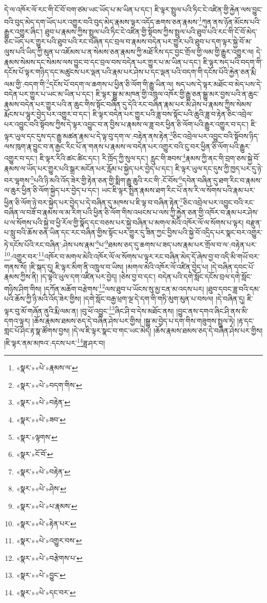 དེ་ལ་འཁོར་ལོ་རང་གི་ངོ་བོ་བག་ཙམ་ཡང་ཡོད་པ་མ་ཡིན་པ་དང་། ཇི་ལྟར་སྤྲུལ་པའི་ཏིང་ངེ་འཛིན་གྱི་རྐྱེན་ལས་བྱུང་བའི་བུད་མེད་དག་ཡོད་པར་འགྱུར་བའི་བུད་མེད་རྣམས་ལྟར་འདོད་ཆགས་ཅན་རྣམས་\footnote{«སྣར་»«པེ་»རྣམས་ལ་}ཀུན་ནས་ཉོན་མོངས་པའི་རྒྱུར་འགྱུར་ཞིང་། ཐུབ་པ་རྣམས་ཀྱིས་སྤྲུལ་པའི་ཏིང་ངེ་འཛིན་གྱི་སྟོབས་ཀྱིས་སྤྲུལ་པའི་ཐུབ་པའི་རང་གི་ངོ་བོ་མེད་ཅིང་ཡོད་པར་གྱུར་པའི་ཐུབ་པའི་རང་བཞིན་དང་བྲལ་བ་རྣམས་བདེན་པར་གྱུར་པའི་ཐུབ་པ་དག་ལྟར་སྐྱེ་བོ་མ་ལུས་པའི་ཡིད་ཀྱི་མུན་པ་འཇོམས་པ་ན་སེམས་ཅན་རྣམས་ཀྱི་མཐོ་རིས་དང་བྱང་གྲོལ་གྱི་ལམ་གྱི་རྒྱུར་འགྱུར་ལ། དེ་རྣམས་སེམས་དང་སེམས་ལས་བྱུང་བ་དང་བྲལ་བས་བདེན་པར་གྱུར་པ་མ་ཡིན་པ་དང་། ཇི་ལྟར་སད་པའི་བདག་གི་དངོས་པོ་ལྟར་གཉིད་དང་མཚུངས་པར་ལྡན་པའི་རྣམ་པར་ཤེས་པ་དང་ལྡན་པའི་བདག་གི་དངོས་པོའི་རྐྱེན་ཅན་རྨི་ལམ་གྱི་:བདག་གི་\footnote{«སྣར་»«པེ་»བདག་གིས་}དངོས་པོ་བདག་ལ་ཆགས་པ་ཕྱིན་ཅི་ལོག་གི་རྒྱུ་ཡིན་ལ། སད་པས་དེ་ལྟར་མཐོང་བ་མེད་པས་དེ་བདེན་པར་གྱུར་པ་ཡང་མ་ཡིན་པ་དང་། ཇི་ལྟར་སྒྱུ་མ་མཁན་གྱི་འཁྲུལ་འཁོར་གྱི་རྒྱུ་ཅན་སྒྱུ་མར་བྱས་པའི་ན་ཆུང་རྣམས་བདེན་པར་གྱུར་པའི་ན་ཆུང་གིས་སྟོང་བཞིན་དུ་དེའི་རང་བཞིན་རྣམ་པར་མི་ཤེས་པ་རྣམས་ཀྱིས་སེམས་རྨོངས་པ་ལྷུར་བྱེད་པར་འགྱུར་བ་དང་། ཇི་ལྟར་བདེན་པར་གྱུར་པའི་ཟླ་བས་སྟོང་པའི་ཆུའི་ཟླ་བ་རྟེན་ཅིང་འབྲེལ་པར་འབྱུང་བའི་སྟོབས་ཀྱིས་དེ་ལྟར་འབྱུང་བ་ན་བྱིས་པ་རྣམས་ལ་ཟླ་བར་ཕྱིན་ཅི་ལོག་པའི་རྒྱུར་འགྱུར་བ་དང་། ཇི་ལྟར་ཡུལ་དང་དུས་དང་རྒྱུ་མཚན་རྣམ་པ་དེ་ལྟ་བུ་དག་ལ་:བརྟེན་ནས་རྟེན་\footnote{«སྣར་»«པེ་»བརྟེན་}ཅིང་འབྲེལ་པར་འབྱུང་བའི་སྟོབས་ཉིད་ལས་ཁུག་རྣ་བྱུང་བ་ན་རྒྱང་རིང་པོ་ན་གནས་པ་རྣམས་ལ་བདེན་པར་འགྱུར་བའི་ངུ་བར་ཕྱིན་ཅི་ལོག་པའི་རྒྱུར་འགྱུར་བ་དང་། ཇི་ལྟར་རིའི་ཚང་ཚིང་དང་། རི་ཁྲོད་ཀྱི་སུལ་དང་། རླུང་གི་ཟབས་\footnote{«སྣར་»«པེ་»ཟབ་}རྣམས་ཀྱི་ནང་གི་བྲག་ཅས་སྐྱེ་བོ་རྣམས་ལ་ཡོད་པར་གྱུར་པའི་སྒྲར་མངོན་པར་རློམ་པ་སྐྱེད་པར་བྱེད་པ་དང་། ཇི་ལྟར་ཡུལ་དང་དུས་ཀྱི་ཁྱད་པར་དུ་ཉེ་བར་ལྷགས་\footnote{«སྣར་»ལྟགས་}པའི་ཉི་མའི་འོད་ཟེར་གྱི་རྟེན་ཅན་གྱི་སྨིག་རྒྱུ་ཆུའི་རང་གི་:ངོ་བོས་\footnote{«སྣར་»ངོ་བོ་}དབེན་བཞིན་དུ་ཐག་རིང་བ་རྣམས་ལ་ཆུར་ཕྱིན་ཅི་ལོག་སྐྱེད་པར་བྱེད་པ་དང་། ཡང་ཇི་ལྟར་སྤྲིན་རྣམས་ཐག་རིང་པོ་ནས་རི་ལ་སོགས་པའི་རྣམ་པར་ཕྱིན་ཅི་ལོག་ཉེ་བར་སྐྱེད་པར་བྱེད་པ་དེ་བཞིན་དུ་མཁས་པ་ཇི་ལྟ་བ་བཞིན་རྟེན་\footnote{«སྣར་»«པེ་»བརྟེན་}ཅིང་འབྲེལ་པར་འབྱུང་བའི་རང་བཞིན་ལ་བཟོ་བ་རྣམས་ལ་མ་རིག་པའི་ཕྱིན་ཅི་ལོག་གིས་འཕངས་པ་ལས་ཀྱི་རྐྱེན་ཅན་གྱི་འཁོར་བ་རྣམ་པར་ཤེས་པ་ལ་སོགས་པའི་སྐྱེ་བ་ཕྱི་རོལ་གྱི་སྣོད་དང་བཅས་པར་སྐྱེ་བཞིན་པ་མགལ་མེའི་འཁོར་ལོ་ལ་སོགས་པ་ལྟར། བརྫུན་པ་སླུ་བའི་ཆོས་ཅན་ཡིན་དང་རང་བཞིན་གྱིས་སྟོང་པར་གྱུར་དུ་ཟིན་ཀྱང་བྱིས་པའི་སྐྱེ་བོ་འདྲིད་པར་སྣང་བར་འགྱུར་ཏེ་དངོས་པོའི་རང་བཞིན་:ཤེས་པས་རྣམ་\footnote{«སྣར་»«པེ་»ཤེས་}པ་\footnote{«སྣར་»«པེ་»པ་རྣམས་}ཐམས་ཅད་དུ་ཆགས་པ་ཟད་པས་རྣམ་པར་གྲོལ་བ་ལ་:བརྟེན་པར་\footnote{«སྣར་»«པེ་»རྟེན་པར་}:འགྱུར་བར་\footnote{«སྣར་»«པེ་»འགྱུར་བས་}འཁོར་བ་མགལ་མེའི་འཁོར་ལོ་ལ་སོགས་པ་ལྟར་རང་བཞིན་མེད་དོ་ཞེས་བྱ་བ་འདི་མི་གཡོ་བར་གནས་སོ། །ཇི་སྐད་དུ། ཇི་ལྟར་མིག་ནི་འཁྲུལ་བ་ཡིས། །མགལ་མེའི་འཁོར་ལོ་འཛིན་བྱེད་པ། །དེ་བཞིན་དབང་པོ་རྣམས་ཀྱིས་ནི། །ད་ལྟའི་ཡུལ་དག་འཛིན་པར་བྱེད། །ཅེས་བྱ་བ་དང་། བདེན་པའི་དགེ་སློང་དངོས་བྲལ་དགེ་སློང་གཉིས་ཤིག་གིས། །དཀོན་མཆོག་བརྩེགས་\footnote{«སྣར་»«པེ་»བརྩེགས་པ་}ལས་ཐུབ་པ་ཡོངས་སུ་མྱ་ངན་མ་འདས་པར། །ཐུབ་དབང་ཟླ་བའི་དམ་པའི་ཆོས་ཀྱི་ཉི་མའི་འོད་ཟེར་གྱིས། །དགེ་སློང་བརྒྱ་ཕྲག་ལྔ་དེ་དག་གི་གཏི་མུག་མུན་པ་བསལ། །དེ་བཞིན་དུ། ཇི་ལྟར་བུ་མོ་གཞོན་ནུའི་རྨི་ལམ་ན། །བུ་ཕོ་འབྱུང་\footnote{«སྣར་»«པེ་»བྱུང་}ཞིང་ཤི་བ་དེས་མཐོང་ནས། །བྱུང་ནས་དགའ་ཞིང་ཤི་ནས་མི་དགའ་ལྟར། །ཆོས་རྣམས་ཐམས་ཅད་དེ་བཞིན་ཤེས་པར་གྱིས། །སྒྱུ་མ་བྱེད་པ་དག་གིས་གཟུགས་སྤྲུལ་ཏེ། །རྟ་དང་གླང་པོ་ཤིང་རྟ་སྣ་ཚོགས་བྱས། །དེ་ལ་ཇི་ལྟར་སྣང་བ་གང་ཡང་མེད། །ཆོས་རྣམས་ཐམས་ཅད་དེ་བཞིན་ཤེས་པར་གྱིས། །ཇི་ལྟར་ནམ་མཁའ་:དངས་པར་\footnote{«སྣར་»«པེ་»དང་བར་}ཟླ་ཤར་བ། 